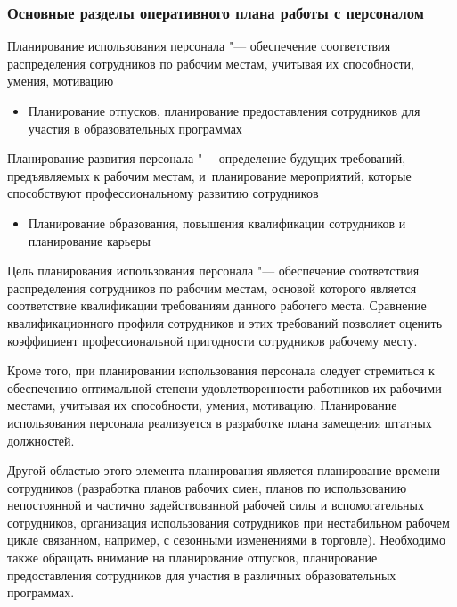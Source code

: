 \documentclass{../industrial-development}
\begin{document}

\begin{frame} \frametitle{Основные разделы оперативного плана работы с персоналом}

\alert{Планирование использования персонала} "--- обеспечение соответствия распределения сотрудников по рабочим местам, учитывая их способности, умения, мотивацию
	
  \begin{itemize}

	\item {\small Планирование отпусков, планирование предоставления сотрудников для участия в образовательных программах}
		  \end{itemize}
			
	\alert{Планирование развития персонала} "--- определение будущих требований, предъявляемых к рабочим местам, и~планирование мероприятий, которые способствуют профессиональному развитию сотрудников
	  \begin{itemize}
		\item {\small Планирование образования, повышения квалификации сотрудников и планирование карьеры}
		\end{itemize}
\end{frame}
\lecturenotes

\alert{Цель планирования использования персонала} "--- обеспечение соответствия распределения сотрудников по рабочим местам, основой которого является соответствие квалификации требованиям данного рабочего места. Сравнение квалификационного профиля сотрудников и этих требований позволяет оценить коэффициент профессиональной пригодности сотрудников рабочему месту.

Кроме того, при планировании использования персонала следует стремиться к обеспечению оптимальной степени удовлетворенности работников их рабочими местами, учитывая их способности, умения, мотивацию. Планирование использования персонала реализуется в разработке плана замещения штатных должностей.

Другой областью этого элемента планирования является планирование времени сотрудников (разработка планов рабочих смен, планов по использованию непостоянной и частично задействованной рабочей силы и вспомогательных сотрудников, организация использования сотрудников при нестабильном рабочем цикле связанном, например, с сезонными изменениями в торговле). Необходимо также обращать внимание на планирование отпусков, планирование предоставления сотрудников для участия в различных образовательных программах.
\end{document}
